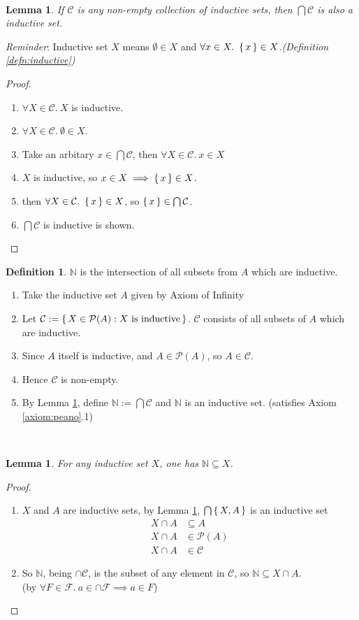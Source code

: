 \documentclass[12pt]{article}
\newenvironment{prf}
{
    \begin{proof}
        \hfill
        \begin{enumerate}[label*=\arabic*.]
                }
                {
                \hfill\qedsymbol
        \end{enumerate}
    \renewcommand{\qedsymbol}{}
    \end{proof}
}
\newcounter{dummy} \numberwithin{dummy}{section}
\newtheorem{lemma}[dummy]{Lemma}
\theoremstyle{definition}
\newtheorem{defn}[dummy]{Definition}
\newcommand{\nat}{\mathbb{N}}
\newcommand{\bigC}{\mathcal{C}}
\newcommand{\power}{\mathcal{P}}
\begin{document}
\hfill\\
\begin{lemma} \label{lemma:0}
    If $\bigC$ is any non-empty collection of inductive sets, then $\bigcap \bigC$ is also a inductive set.
\end{lemma}
\emph{Reminder}: Inductive set $X$ means $\emptyset \in X$ and $\forall x \in X.~ \set{x} \in X$.\hfill \emph{(Definition \ref{defn:inductive})}
\begin{prf}
\item $\forall X \in \bigC.~ X$ is inductive.
\item $\forall X \in \bigC.~ \emptyset \in X$.
\item Take an arbitary $x \in \bigcap\bigC$, then $\forall X \in\bigC.~ x \in X$
\item $X$ is inductive, so $x \in X \implies \set{x} \in X$.
\item then $\forall X \in\bigC.~ \set{x} \in X$, so $\set{x} \in \bigcap\bigC$.
\item $\bigcap\bigC$ is inductive is shown.
\end{prf}

\begin{defn} \label{def:setN}
    $\nat$ is the intersection of all subsets from $A$ which are inductive.
\end{defn}
\begin{enumerate}
    \item Take the inductive set $A$ given by Axiom of Infinity
    \item Let $\bigC := \set{ X \in \power(A) : X ~\text{is inductive} }$. $\bigC$ consists of all subsets of $A$ which are inductive.
    \item Since $A$ itself is inductive, and $A \in \power(A)$, so $A \in \bigC.$
    \item Hence $\mathcal{C}$ is non-empty.
    \item By Lemma \ref{lemma:0}, define $\nat := \bigcap \mathcal{C}$ and $\nat$ is an inductive set. (satisfies Axiom \ref{axiom:peano}.1)
\end{enumerate}
\hfill\\

\begin{lemma} \label{lemma:1}
    For any inductive set $X$, one has $\nat \subseteq X$.
\end{lemma}
\begin{prf}
\item $X$ and $A$ are inductive sets, by Lemma \ref{lemma:0}, $\bigcap\set{X, A}$ is an inductive set
    \begin{align*}
        X \cap A &\subseteq A\\
        X \cap A &\in \power(A)\\
        X \cap A &\in \bigC
    \end{align*}
\item So $\nat$, being $\cap\bigC$, is the subset of any element in $\bigC$, so $\nat \subseteq X \cap A$.\\
    (by $\forall F \in \mathcal{F}.~ a \in \cap\mathcal{F} \implies a \in F$)
\end{prf}
\end{document}
